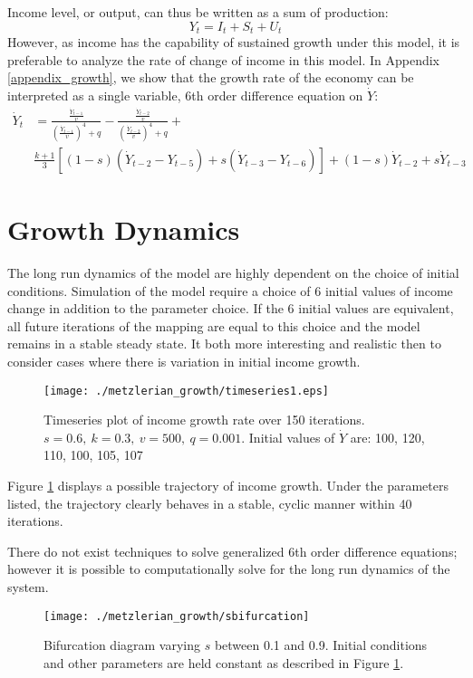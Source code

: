 Income level, or output, can thus be written as a sum of production:
\begin{equation}\label{eq:Income}
    Y_t=I_t+S_t+U_t
\end{equation}
However, as income has the capability of sustained growth under this model, it is preferable to analyze the rate of change of income in this model. In Appendix \ref{appendix_growth}, we show that the growth rate of the economy can be interpreted as a single variable, 6th order difference equation on $\dot Y$:
\begin{equation}
    \begin{split}
        \dot Y_{t}& = \frac{\frac{\dot Y_{t-1}}{v}}{\left(\frac{\dot Y_{t-1}}{v}\right)^4+q}-\frac{\frac{\dot Y_{t-2}}{v}}{\left(\frac{\dot Y_{t-2}}{v}\right)^4+q} + \\
        & \frac{k+1}{3}\left[(1-s)(\dot Y_{t-2}-Y_{t-5})+s(\dot Y_{t-3}-Y_{t-6})\right]+(1-s)\dot Y_{t-2}+s\dot Y_{t-3}
    \end{split}
    \end{equation}

\section{Growth Dynamics}
The long run dynamics of the model are highly dependent on the choice of initial conditions. Simulation of the model require a choice of 6 initial values of income change in addition to the parameter choice. If the 6 initial values are equivalent, all future iterations of the mapping are equal to this choice and the model remains in a stable steady state. It both more interesting and realistic then to consider cases where there is variation in initial income growth.
\begin{figure}[ht]
    \centering
    \texttt{[image: ./metzlerian\_growth/timeseries1.eps]}
    \caption{Timeseries plot of income growth rate over 150 iterations. $s=0.6,\ k=0.3,\ v=500,\ q=0.001$. Initial values of $\dot Y$ are: 100, 120, 110, 100, 105, 107}
    \label{growth_timeseries1}
\end{figure}
Figure \ref{growth_timeseries1} displays a possible trajectory of income growth. Under the parameters listed, the trajectory clearly behaves in a stable, cyclic manner within 40 iterations. 

There do not exist techniques to solve generalized 6th order difference equations; however it is possible to computationally solve for the long run dynamics of the system.
\begin{figure}
    \centering
    \texttt{[image: ./metzlerian\_growth/sbifurcation]}
    \caption{Bifurcation diagram varying $s$ between 0.1 and 0.9. Initial conditions and other parameters are held constant as described in Figure \ref{growth_timeseries1}.}
    \label{metzlerian_growth-sbifurcation}
\end{figure}

